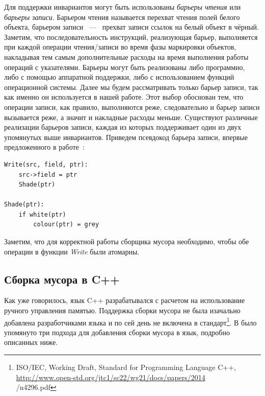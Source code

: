 Для поддержки инвариантов могут быть использованы \emph{барьеры чтения} или 
\emph{барьеры записи}. 
Барьером чтения называется перехват чтения полей белого объекта, барьером записи ~---~ 
прехват записи ссылок на белый объект в чёрный. 
Заметим, что последовательность инструкций, реализующая барьер, выполняется при каждой 
операции чтения/записи во время фазы маркировки объектов, накладывая тем самым дополнительные 
расходы на время выполнения работы операций с указателями. 
Барьеры могут быть реализованы либо программно, либо с помощью аппаратной поддержки, 
либо с использованием функций операционной системы. 
Далее мы будем рассматривать только барьер записи, так как именно он используется в нашей 
работе. 
Этот выбор обоснован тем, что операции записи, как правило, выполняются реже, следовательно 
и барьер записи вызывается реже, а значит и накладные расходы меньше. 
Существуют различные реализации барьеров записи, каждая из которых поддерживает один из двух 
упомянутых выше инвариантов. 
Приведем псевдокод барьера записи, впервые предложенного в работе~\cite{dijkstra1978fly}:

\begin{lstlisting}[caption={Dijkstra Barier}, label={code:write_barrier}]
Write(src, field, ptr):
    src->field = ptr
    Shade(ptr)
    
Shade(ptr):
    if white(ptr)
        colour(ptr) = grey
\end{lstlisting}

Заметим, что для корректной работы сборщика мусора необходимо, чтобы обе операции в функции 
\emph{Write} были атомарны. 


\subsection{Сборка мусора в C++}

Как уже говорилось, язык C++ разрабатывался с расчетом на использование ручного 
управления памятью. 
Поддержка сборки мусора не была изачально добавлена разработчиками языка и по сей день 
не включена в стандарт\footnote{ISO/IEC, Working Draft, Standard for Programming Language C++,
\url{http://www.open-std.org/jtc1/sc22/wg21/docs/papers/2014}\\{/n4296.pdf}}. 
В \cite{boehm2007transparent} было упомянуто три подхода для добавления сборки мусора в 
язык, подробно описанных ниже.

